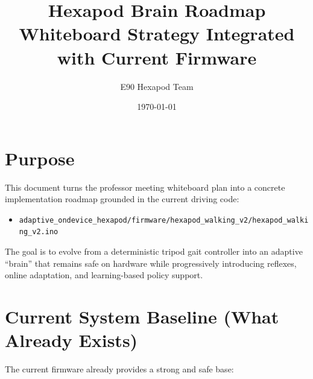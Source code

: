 \documentclass[11pt]{article}
\title{Hexapod Brain Roadmap\\\large Whiteboard Strategy Integrated with Current Firmware}
\author{E90 Hexapod Team}
\date{\today}
\begin{document}
\maketitle

\section{Purpose}

This document turns the professor meeting whiteboard plan into a concrete implementation roadmap grounded in the current driving code:

\begin{itemize}
    \item \texttt{adaptive\_ondevice\_hexapod/firmware/hexapod\_walking\_v2/hexapod\_walking\_v2.ino}
\end{itemize}

The goal is to evolve from a deterministic tripod gait controller into an adaptive ``brain'' that remains safe on hardware while progressively introducing reflexes, online adaptation, and learning-based policy support.

\section{Current System Baseline (What Already Exists)}

The current firmware already provides a strong and safe base:
\end{document}
